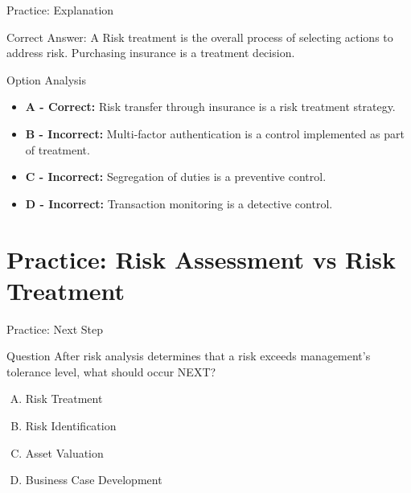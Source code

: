\documentclass{beamer}
\begin{document}
	\begin{frame}{Practice: Explanation}
		\begin{block}{Correct Answer: A}
			Risk treatment is the overall process of selecting actions to address risk. Purchasing insurance is a treatment decision.
		\end{block}
		\begin{block}{Option Analysis}
			\begin{itemize}
				\item \textbf{A - Correct:} Risk transfer through insurance is a risk treatment strategy.
				\item \textbf{B - Incorrect:} Multi-factor authentication is a control implemented as part of treatment.
				\item \textbf{C - Incorrect:} Segregation of duties is a preventive control.
				\item \textbf{D - Incorrect:} Transaction monitoring is a detective control.
			\end{itemize}
		\end{block}
	\end{frame}
	
	

	
	\section{Practice: Risk Assessment vs Risk Treatment}
	
	\begin{frame}{Practice: Next Step}
		\begin{block}{Question}
			After risk analysis determines that a risk exceeds management's tolerance level, what should occur NEXT?
		\end{block}
		\begin{enumerate}[(A)]
			\item Risk Treatment
			\item Risk Identification
			\item Asset Valuation
			\item Business Case Development
		\end{enumerate}
	\end{frame}
	
\end{document}
